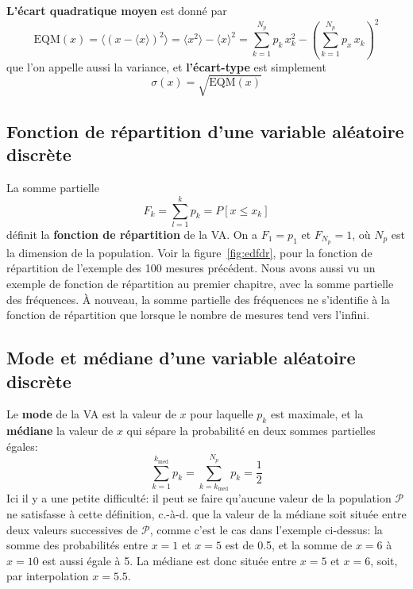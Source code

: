 \documentclass[main.tex]{subfiles}
\begin{document}
\textbf{L'écart quadratique moyen} est donné par
\begin{equation}
    \text{EQM}(x)=\langle (x-\langle x\rangle)^2\rangle=\langle x^2\rangle-\langle x\rangle^2=\sum_{k=1}^{N_p}p_k\,x_k^2-\left(\sum_{k=1}^{N_p}p_x\,x_k\right)^2
\end{equation}
que l'on appelle aussi la variance, et \textbf{l'écart-type} est simplement
\begin{equation}
    \sigma(x)=\sqrt{\text{EQM}(x)}
\end{equation}

\subsection{Fonction de répartition d'une variable aléatoire discrète}

La somme partielle
\begin{equation}
    F_k=\sum_{l=1}^{k} p_k=P[x\le x_k]
\end{equation}
définit la \textbf{fonction de répartition} de la VA. On a $F_1=p_1$ et $F_{N_p}=1$, où $N_p$ est la dimension de la population. Voir la figure~\ref{fig:edfdr}, pour la fonction de répartition de l'exemple des 100 mesures précédent. Nous avons aussi vu un exemple de fonction de répartition au premier chapitre, avec la somme partielle des fréquences. À nouveau, la somme partielle des fréquences ne s'identifie à la fonction de répartition que lorsque le nombre de mesures tend vers l'infini.

\subsection{Mode et médiane d'une variable aléatoire discrète}

Le \textbf{mode} de la VA est la valeur de $x$ pour laquelle $p_k$ est maximale, et la \textbf{médiane} la valeur de $x$ qui sépare la probabilité en deux sommes partielles égales:
\begin{equation}
    \sum_{k=1}^{k_{\text{med}}}p_k=\sum_{k=k_{\text{med}}}^{N_p}p_k=\frac{1}{2}
\end{equation}
Ici il y a une petite difficulté: il peut se faire qu'aucune valeur de la population $\mathcal{P}$ ne satisfasse à cette définition, c.-à-d. que la valeur de la médiane soit située entre deux valeurs successives de $\mathcal{P}$, comme c'est le cas dans l'exemple ci-dessus: la somme des probabilités entre $x=1$ et $x=5$ est de 0.5, et la somme de $x=6$ à $x=10$ est aussi égale à 5. La médiane est donc située entre $x=5$ et $x=6$, soit, par interpolation $x=5.5$.
\end{document}
